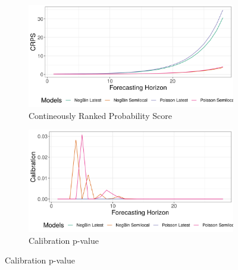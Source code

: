 \begin{figure}[H]
\begin{subfigure}{0.5\textwidth}
  \centering
  \includegraphics[width=\linewidth]{../output/Masereka_crps.png}  
  \caption{Contineously Ranked Probability Score}
  \label{fig:sub-first}
\end{subfigure}
\begin{subfigure}{0.5\textwidth}
  \centering
  \includegraphics[width=\linewidth]{../output/Masereka_calibration.png}  
  \caption{Calibration p-value}
  \label{fig:sub-second}
\end{subfigure}


\end{figure}

